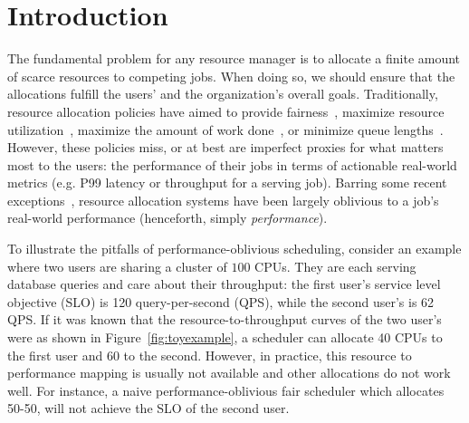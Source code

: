 
\section{Introduction}
\label{sec:cilantro_intro}




The fundamental problem for any resource manager is to allocate a finite amount of
scarce resources to competing jobs.
When doing so, we should ensure that the allocations fulfill the users' and the
organization's overall goals.
% 
Traditionally, resource allocation policies have aimed to
provide fairness~\citep{ghodsi2011dominant,demers1989analysis},
maximize resource utilization~\citep{gandiva},
maximize the amount of work done~\citep{ghodsi2011dominant},
or
minimize queue lengths~\citep{racksched,sparrow}.
% 
However,
these policies miss, or at best are imperfect proxies for what matters most to the users:
the performance of their jobs in terms of actionable real-world metrics
(e.g. P99 latency or throughput for a serving job).
Barring some recent exceptions~\citep{delimitrou2014quasar,chen2019parties,zhang2021sinan,jockey},
resource allocation systems have been largely oblivious to a job's real-world performance
(henceforth, simply \emph{performance}). 


\insertResUtilIllus

To illustrate the pitfalls of performance-oblivious scheduling,
consider an example where two users are sharing a cluster of $100$ CPUs.
They are each serving database queries and care about their throughput:
the first user's service level objective (SLO) is 120 query-per-second (QPS),
while the second user's is 62 QPS.
If it was known that the resource-to-throughput curves of the two user's were as shown
in Figure~\ref{fig:toyexample},
a scheduler can allocate 40 CPUs to the first user and 60 to the second.
However, in practice, this resource to performance mapping is usually not available and other allocations do not work well.
For instance, a naive performance-oblivious fair scheduler which allocates 50-50, will not achieve the SLO of the second user.

